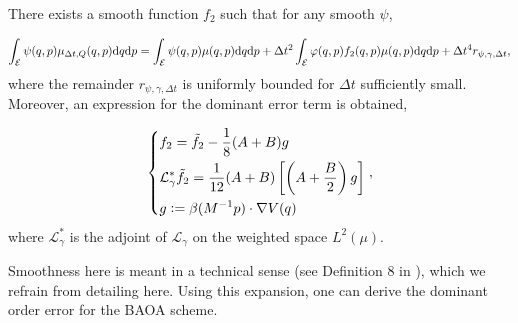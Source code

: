 \begin{theorem}
  There exists a smooth function $f_2$ such that for any smooth $\psi$,

  \begin{equation}
    \label{BAOAB expansion}
   \int_{\mathcal E}\psi(q,p) \mu_{\Delta t,Q}(q,p) \text  dq \mathrm{d}p=\int_{\mathcal E}\psi(q,p)\mu(q,p)\mathrm{d}q \mathrm{d}p+\Delta t^2\int_{\mathcal E}\varphi(q,p) f_2(q,p)\mu(q,p)\mathrm{d}q \mathrm{d}p + \Delta t^4 r_{\psi,\gamma,\Delta t},
  \end{equation}
  where the remainder $r_{\psi,\gamma,\Delta t}$ is uniformly bounded for $\Delta t$ sufficiently small. Moreover, an expression for the dominant error term is obtained, 
  
  \begin{equation}
    \label{remainder term}
    \left\{\begin{aligned}
    &f_2=\tilde f_2-\frac18(A+B)g\\
    &\mathcal L^{*}_\gamma\tilde f_2=\frac1{12}(A+B)\left[\left(A+\frac B2\right)g\right]\\
    &g\mathrel{\mathop:}=\beta(M^{-1}p)\cdot \nabla V(q)
    \end{aligned}\right.,
  \end{equation}
  where $\mathcal L^*_\gamma$ is the adjoint of $\mathcal L_\gamma$ on the weighted space $L^2(\mu)$.  
\end{theorem}
 Smoothness here is meant in a technical sense (see Definition 8 in \cite{LMS13}), which we refrain from detailing here. Using this expansion, one can derive the dominant order error for the BAOA scheme.


